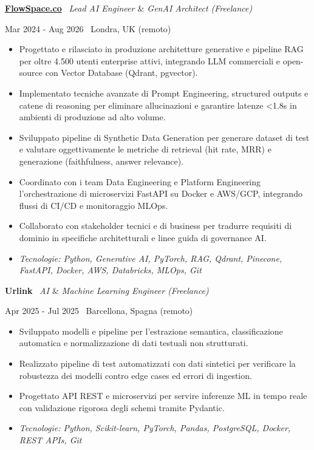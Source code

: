 \documentclass[a4paper,10pt]{article}
\newcommand{\role}[4]{%
  \vspace{2pt}\noindent
  \begin{minipage}[t]{0.70\textwidth}\raggedright\textbf{#1} \textbullet\ \textit{#3}\end{minipage}%
  \hfill
  \begin{minipage}[t]{0.28\textwidth}\raggedleft\footnotesize\color{gray}#2 \textbullet\ #4\end{minipage}%
  \vspace{1pt}%
}
\begin{document}
\role{\href{https://flowspace.co}{FlowSpace.co}}{Mar 2024 - Aug 2026}{Lead AI Engineer $\&$ GenAI Architect (Freelance)}{Londra, UK (remoto)}
\begin{itemize}
  \item Progettato e rilasciato in produzione architetture generative e pipeline RAG per oltre 4.500 utenti enterprise attivi, integrando LLM commerciali e open-source con Vector Database (Qdrant, pgvector).
  \item Implementato tecniche avanzate di Prompt Engineering, structured outputs e catene di reasoning per eliminare allucinazioni e garantire latenze <1.8s in ambienti di produzione ad alto volume.
  \item Sviluppato pipeline di Synthetic Data Generation per generare dataset di test e valutare oggettivamente le metriche di retrieval (hit rate, MRR) e generazione (faithfulness, answer relevance).
  \item Coordinato con i team Data Engineering e Platform Engineering l'orchestrazione di microservizi FastAPI su Docker e AWS/GCP, integrando flussi di CI/CD e monitoraggio MLOps.
  \item Collaborato con stakeholder tecnici e di business per tradurre requisiti di dominio in specifiche architetturali e linee guida di governance AI.
  \item \textit{Tecnologie: Python, Generative AI, PyTorch, RAG, Qdrant, Pinecone, FastAPI, Docker, AWS, Databricks, MLOps, Git}
\end{itemize}

\role{Urlink}{Apr 2025 - Jul 2025}{AI $\&$ Machine Learning Engineer (Freelance)}{Barcellona, Spagna (remoto)}
\begin{itemize}
  \item Sviluppato modelli e pipeline per l'estrazione semantica, classificazione automatica e normalizzazione di dati testuali non strutturati.
  \item Realizzato pipeline di test automatizzati con dati sintetici per verificare la robustezza dei modelli contro edge cases ed errori di ingestion.
  \item Progettato API REST e microservizi per servire inferenze ML in tempo reale con validazione rigorosa degli schemi tramite Pydantic.
  \item \textit{Tecnologie: Python, Scikit-learn, PyTorch, Pandas, PostgreSQL, Docker, REST APIs, Git}
\end{itemize}
\end{document}
